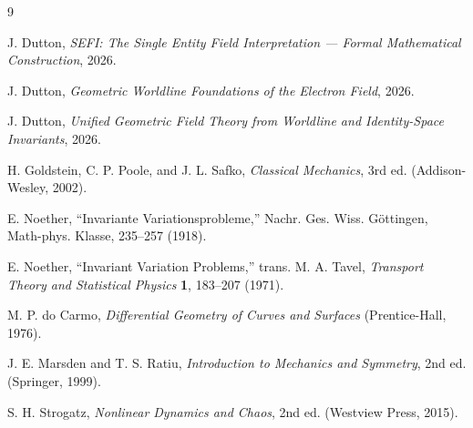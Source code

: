 \documentclass[aip,jmp,reprint,onecolumn,nofootinbib]{revtex4-2}
\begin{document}
\begin{thebibliography}{9}

J. Dutton, \emph{SEFI: The Single Entity Field Interpretation --- Formal
Mathematical Construction}, 2026.

J. Dutton, \emph{Geometric Worldline Foundations of the Electron Field}, 2026.

J. Dutton, \emph{Unified Geometric Field Theory from Worldline and
Identity-Space Invariants}, 2026.

H. Goldstein, C. P. Poole, and J. L. Safko, \emph{Classical Mechanics}, 3rd ed.
(Addison-Wesley, 2002).

E. Noether, ``Invariante Variationsprobleme,'' Nachr. Ges. Wiss. G\"ottingen,
Math-phys. Klasse, 235--257 (1918).

E. Noether, ``Invariant Variation Problems,'' trans. M. A. Tavel,
\emph{Transport Theory and Statistical Physics} \textbf{1}, 183--207 (1971).

M. P. do Carmo, \emph{Differential Geometry of Curves and Surfaces}
(Prentice-Hall, 1976).

J. E. Marsden and T. S. Ratiu, \emph{Introduction to Mechanics and Symmetry},
2nd ed. (Springer, 1999).

S. H. Strogatz, \emph{Nonlinear Dynamics and Chaos}, 2nd ed. (Westview Press,
2015).

\end{thebibliography}
\end{document}
